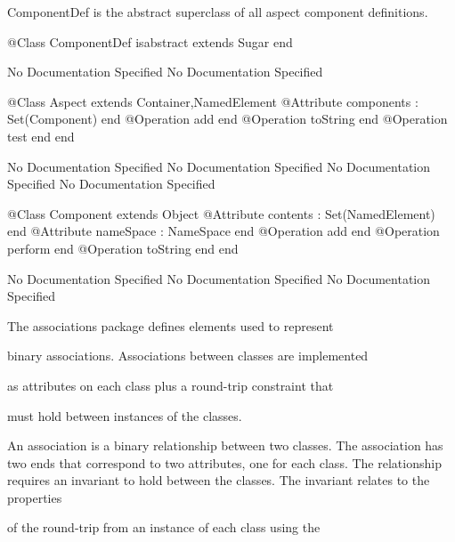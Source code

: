       ComponentDef is the abstract superclass of all aspect component 
      definitions.
\begin{Interface}
@Class ComponentDef isabstract extends Sugar
end
\end{Interface}
No Documentation Specified
No Documentation Specified
\begin{Interface}
@Class Aspect extends Container,NamedElement
  @Attribute components : Set(Component) end
  @Operation add end
  @Operation toString end
  @Operation test end
end
\end{Interface}
No Documentation Specified
No Documentation Specified
No Documentation Specified
No Documentation Specified
\begin{Interface}
@Class Component extends Object
  @Attribute contents : Set(NamedElement) end
  @Attribute nameSpace : NameSpace end
  @Operation add end
  @Operation perform end
  @Operation toString end
end
\end{Interface}
No Documentation Specified
No Documentation Specified
No Documentation Specified

      The associations package defines elements used to represent

      binary associations. Associations between classes are implemented

      as attributes on each class plus a round-trip constraint that

      must hold between instances of the classes.

      An association is a binary relationship between two classes.
      The association has two ends that correspond to two attributes,
      one for each class. The relationship requires an invariant to 
      hold between the classes. The invariant relates to the properties

      of the round-trip from an instance of each class using the

